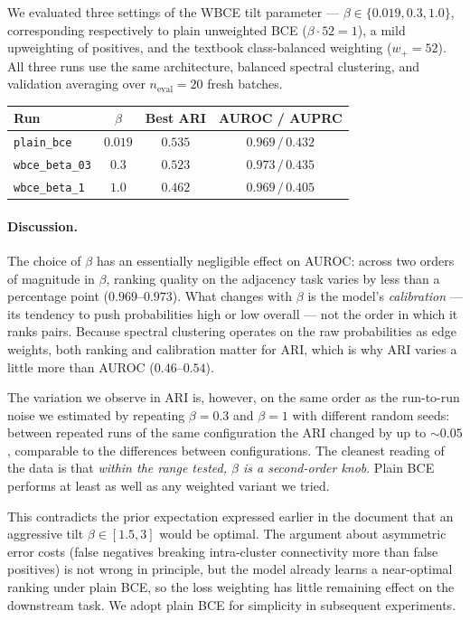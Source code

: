 \documentclass[12pt, a4paper]{article}
\begin{document}
We evaluated three settings of the WBCE tilt parameter --- $\beta \in
\{0.019, 0.3, 1.0\}$, corresponding respectively to plain unweighted BCE
($\beta \cdot 52 = 1$), a mild upweighting of positives, and the textbook
class-balanced weighting ($w_{+} = 52$). All three runs use the same
architecture, balanced spectral clustering, and validation averaging over
$n_{\text{eval}} = 20$ fresh batches.

\begin{center}
\begin{tabular}{lccc}
\toprule
\textbf{Run} & \textbf{$\beta$} & \textbf{Best ARI} & \textbf{AUROC / AUPRC} \\
\midrule
\texttt{plain\_bce}     & $0.019$ & $0.535$ & $0.969 \,/\, 0.432$ \\
\texttt{wbce\_beta\_03} & $0.3$   & $0.523$ & $0.973 \,/\, 0.435$ \\
\texttt{wbce\_beta\_1}  & $1.0$   & $0.462$ & $0.969 \,/\, 0.405$ \\
\bottomrule
\end{tabular}
\end{center}

\paragraph{Discussion.}
The choice of $\beta$ has an essentially negligible effect on AUROC: across two
orders of magnitude in $\beta$, ranking quality on the adjacency task varies by
less than a percentage point ($0.969$--$0.973$). What changes with $\beta$ is
the model's \emph{calibration} --- its tendency to push probabilities high or
low overall --- not the order in which it ranks pairs. Because spectral
clustering operates on the raw probabilities as edge weights, both ranking and
calibration matter for ARI, which is why ARI varies a little more than
AUROC ($0.46$--$0.54$).

The variation we observe in ARI is, however, on the same order as the
run-to-run noise we estimated by repeating $\beta = 0.3$ and $\beta = 1$ with
different random seeds: between repeated runs of the same configuration the
ARI changed by up to $\sim 0.05$, comparable to the differences between
configurations. The cleanest reading of the data is that \emph{within the
range tested, $\beta$ is a second-order knob}. Plain BCE performs at least as
well as any weighted variant we tried.

This contradicts the prior expectation expressed earlier in the document
that an aggressive tilt $\beta \in [1.5, 3]$ would be optimal. The argument
about asymmetric error costs (false negatives breaking intra-cluster
connectivity more than false positives) is not wrong in principle, but the
model already learns a near-optimal ranking under plain BCE, so the loss
weighting has little remaining effect on the downstream task. We adopt
plain BCE for simplicity in subsequent experiments.
\end{document}

